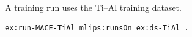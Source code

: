 A training run uses the Ti--Al training dataset.
\begin{lstlisting}[language=turtle]
ex:run-MACE-TiAl mlips:runsOn ex:ds-TiAl .
\end{lstlisting}
